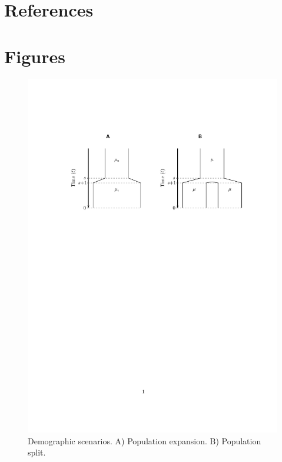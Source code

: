 \documentclass[preprint]{elsarticle}
\newcommand\eg{{\it e.g.,}}
\begin{document}


\section*{References}



\newpage

\section*{Figures}

\begin{figure}[ht]
\includegraphics[width = 12cm]{diags.pdf}
\caption{Demographic scenarios. A) Population expansion. B) Population split.}\label{diag}
\end{figure}
\end{document}

